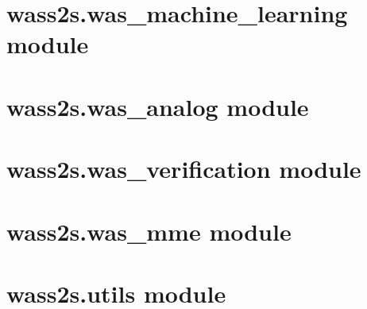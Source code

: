 \documentclass[letterpaper,10pt,english]{sphinxmanual}
\begin{document}
\section{wass2s.was\_machine\_learning module}
\label{\detokenize{api:wass2s-was-machine-learning-module}}

\section{wass2s.was\_analog module}
\label{\detokenize{api:wass2s-was-analog-module}}

\section{wass2s.was\_verification module}
\label{\detokenize{api:wass2s-was-verification-module}}

\section{wass2s.was\_mme module}
\label{\detokenize{api:wass2s-was-mme-module}}

\section{wass2s.utils module}
\label{\detokenize{api:wass2s-utils-module}}


\renewcommand{\indexname}{Index}
\printindex
\end{document}
